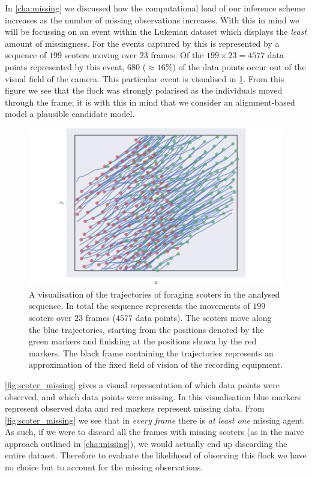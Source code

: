 In \cref{cha:missing} we discussed how the computational load of our inference
scheme increases as the number of missing observations increases. With this in
mind we will be focussing on an event within the Lukeman dataset which displays
the \emph{least} amount of missingness. For the events captured by
\textcite{lukeman10} this is represented by a sequence of $199$ scoters moving
over $23$ frames. Of the $199\times23=4577$ data points represented by this
event, $680$ ($\approx16\%)$ of the data points occur out of the visual field of
the camera. This particular event is visualised in \cref{fig:scoter_traj}. From
this figure we see that the flock was strongly polarised as the individuals
moved through the frame; it is with this in mind that we consider an
alignment-based model a plausible candidate model.

\begin{figure}[tb]
  \includegraphics{data_00_traj.pdf}
  \caption{A visualisation of the trajectories of foraging scoters in the
      analysed sequence. In total the sequence represents the movements of
      $199$ scoters over $23$ frames ($4577$ data points). The scoters move
      along the blue trajectories, starting from the positions denoted by the
      green markers and finishing at the positions shown by the red markers.
      The black frame containing the trajectories represents an approximation
      of the fixed field of vision of the recording equipment.}
  \label{fig:scoter_traj}
\end{figure}

\cref{fig:scoter_missing} gives a visual representation of which data points
were observed, and which data points were missing. In this visualisation blue
markers represent observed data and red markers represent missing data. From
\cref{fig:scoter_missing} we see that in \emph{every frame} there is \emph{at
least one} missing agent. As such, if we were to discard all the frames with
missing scoters (as in the naive approach outlined in \cref{cha:missing}), we
would actually end up discarding the entire dataset. Therefore to evaluate the
likelihood of observing this flock we have no choice but to account for the
missing observations.

